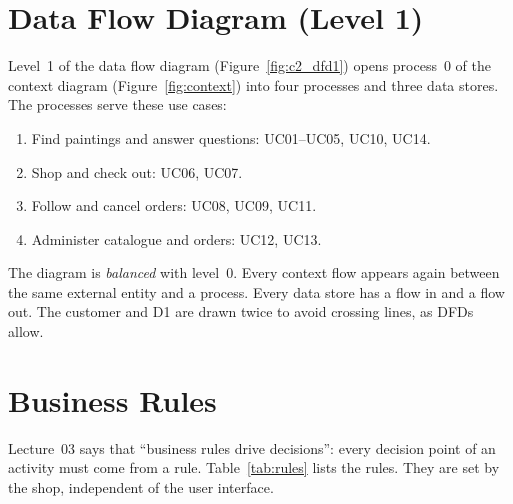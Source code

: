 \section{Data Flow Diagram (Level 1)}\label{sec:dfd1}

Level~1 of the data flow diagram (Figure~\ref{fig:c2_dfd1}) opens process~0 of the context diagram
(Figure~\ref{fig:context}) into four processes and three data stores. The processes serve these use cases:
\begin{enumerate}
\item Find paintings and answer questions: UC01--UC05, UC10, UC14.
\item Shop and check out: UC06, UC07.
\item Follow and cancel orders: UC08, UC09, UC11.
\item Administer catalogue and orders: UC12, UC13.
\end{enumerate}
The diagram is \emph{balanced} with level~0. Every context flow appears again between the same external entity and
a process. Every data store has a flow in and a flow out. The customer and D1 are drawn twice to avoid crossing lines,
as DFDs allow.


\section{Business Rules}\label{sec:2.3}

Lecture~03 says that ``business rules drive decisions'': every decision point of an activity must come from a
rule. Table~\ref{tab:rules} lists the rules. They are set by the shop, independent of the user interface.

